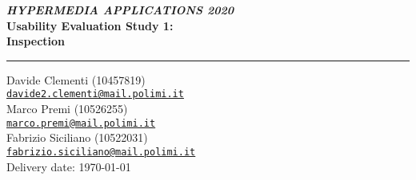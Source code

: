 \begin{titlepage}
	\begin{flushleft}
		\textit{\textbf{HYPERMEDIA APPLICATIONS 2020}}\\
		\vspace{0.8cm}
		{\Huge \bfseries \sffamily Usability Evaluation Study 1:\\Inspection}
		\vspace{0.8cm}
		\rule{\textwidth}{0.1cm} 
		\vspace{0.8cm}  
	\end{flushleft} 
	\begin{center}
		Davide Clementi (10457819)\\[0cm]
		{\small \href{mailto:davide2.clementi@mail.polimi.it}{\texttt{davide2.clementi@mail.polimi.it}}}
		\\[0.5cm]
		Marco Premi (10526255)\\[0cm]
		{\small \href{mailto:marco.premi@mail.polimi.it}{\texttt{marco.premi@mail.polimi.it}}}
		\\[0.5cm]
		Fabrizio Siciliano (10522031)\\[0cm]
		{\small \href{mailto:fabrizio.siciliano@mail.polimi.it}{\texttt{fabrizio.siciliano@mail.polimi.it}}}\\
		\vspace{1.5cm} 
		Delivery date: \today\\[5ex] 
		\vspace{1.5cm}
	\end{center} 
\end{titlepage} 
\setcounter{page}{1} %